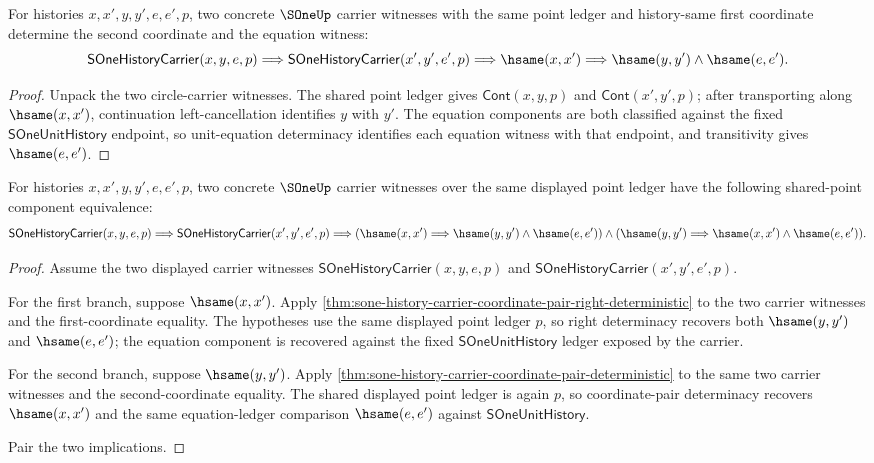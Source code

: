 \begin{theorem}
\label{thm:sone-history-carrier-coordinate-pair-right-deterministic}
For histories $x,x',y,y',e,e',p$, two concrete $\SOneUp$ carrier witnesses with
the same point ledger and history-same first coordinate determine the second
coordinate and the equation witness:
$$
\mathsf{SOneHistoryCarrier}(x,y,e,p)
\Longrightarrow
\mathsf{SOneHistoryCarrier}(x',y',e',p)
\Longrightarrow
\hsame(x,x')
\Longrightarrow
\hsame(y,y')\land\hsame(e,e').
$$
\end{theorem}
\begin{proof}
Unpack the two circle-carrier witnesses. The shared point ledger gives
$\mathsf{Cont}(x,y,p)$ and $\mathsf{Cont}(x',y',p)$; after transporting along
$\hsame(x,x')$, continuation left-cancellation identifies $y$ with $y'$. The
equation components are both classified against the fixed
$\mathsf{SOneUnitHistory}$ endpoint, so unit-equation determinacy identifies
each equation witness with that endpoint, and transitivity gives
$\hsame(e,e')$.
\end{proof}

\begin{theorem}
\label{thm:sone-shared-point-component-iff}
For histories $x,x',y,y',e,e',p$, two concrete $\SOneUp$ carrier witnesses over
the same displayed point ledger have the following shared-point component
equivalence:
$$
\mathsf{SOneHistoryCarrier}(x,y,e,p)
\Longrightarrow
\mathsf{SOneHistoryCarrier}(x',y',e',p)
\Longrightarrow
(\hsame(x,x') \Longrightarrow \hsame(y,y')\land\hsame(e,e'))
\land
(\hsame(y,y') \Longrightarrow \hsame(x,x')\land\hsame(e,e')).
$$
\end{theorem}
\begin{proof}
Assume the two displayed carrier witnesses
$\mathsf{SOneHistoryCarrier}(x,y,e,p)$ and
$\mathsf{SOneHistoryCarrier}(x',y',e',p)$.

For the first branch, suppose $\hsame(x,x')$. Apply
\autoref{thm:sone-history-carrier-coordinate-pair-right-deterministic} to the
two carrier witnesses and the first-coordinate equality. The hypotheses use the
same displayed point ledger $p$, so right determinacy recovers both
$\hsame(y,y')$ and $\hsame(e,e')$; the equation component is recovered against
the fixed $\mathsf{SOneUnitHistory}$ ledger exposed by the carrier.

For the second branch, suppose $\hsame(y,y')$. Apply
\autoref{thm:sone-history-carrier-coordinate-pair-deterministic} to the same
two carrier witnesses and the second-coordinate equality. The shared displayed
point ledger is again $p$, so coordinate-pair determinacy recovers
$\hsame(x,x')$ and the same equation-ledger comparison $\hsame(e,e')$ against
$\mathsf{SOneUnitHistory}$.

Pair the two implications.
\end{proof}


